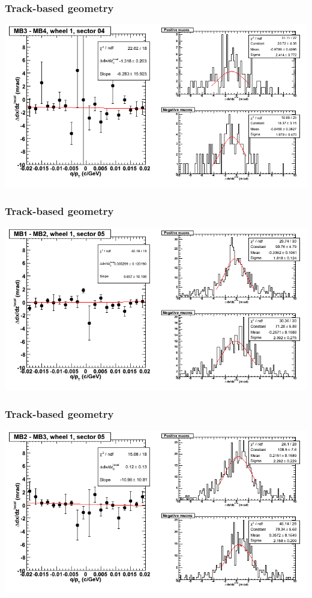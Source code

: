\documentclass[compress]{beamer}
\begin{document}
\begin{frame}
\frametitle{Track-based geometry}
\includegraphics[width=\linewidth]{NOV4_segdiffs/dt13_slope_D_04_34.png}
\end{frame}

\begin{frame}
\frametitle{Track-based geometry}
\includegraphics[width=\linewidth]{NOV4_segdiffs/dt13_slope_D_05_12.png}
\end{frame}

\begin{frame}
\frametitle{Track-based geometry}
\includegraphics[width=\linewidth]{NOV4_segdiffs/dt13_slope_D_05_23.png}
\end{frame}
\end{document}
